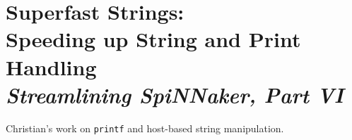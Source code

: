 \chapter[Superfast Strings]{Superfast Strings:\\
Speeding up String and Print Handling\\
{\it Streamlining SpiNNaker, Part VI}}

Christian's work on {\tt printf} and host-based string manipulation.
